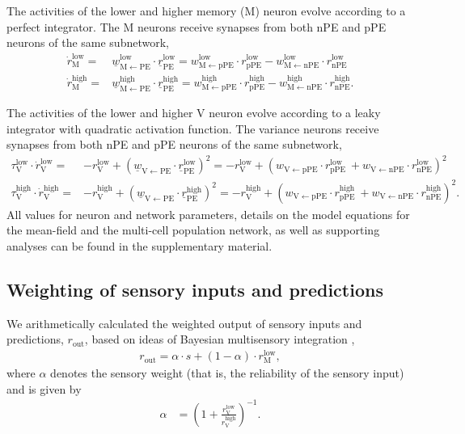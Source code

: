 \documentclass[10pt,a4paper]{article}
\begin{document}
The activities of the lower and higher memory (M) neuron evolve according to a perfect integrator. The M neurons receive synapses from both nPE and pPE neurons of the same subnetwork,
%
\begin{align}
\dot{r}_\mathrm{M}^\mathrm{low} =& \underline{w}_\mathrm{M \leftarrow PE}^\mathrm{low} \cdot \underline{r}_\mathrm{PE}^\mathrm{low} = w_\mathrm{M \leftarrow pPE}^\mathrm{low} \cdot r_\mathrm{pPE}^\mathrm{low} - w_\mathrm{M \leftarrow nPE}^\mathrm{low} \cdot r_\mathrm{nPE}^\mathrm{low} \nonumber \\
%
\dot{r}_\mathrm{M}^\mathrm{high} =& \underline{w}_\mathrm{M \leftarrow PE} ^\mathrm{high} \cdot \underline{r}_\mathrm{PE}^\mathrm{high} = w_\mathrm{M \leftarrow pPE}^\mathrm{high}  \cdot r_\mathrm{pPE}^\mathrm{high} - w_\mathrm{M \leftarrow nPE}^\mathrm{high}  \cdot r_\mathrm{nPE}^\mathrm{high} .
\end{align}
%

The activities of the lower and higher V neuron evolve according to a leaky integrator with quadratic activation function. The variance neurons receive synapses from both nPE and pPE neurons of the same subnetwork,
%
\begin{align}
\tau_\mathrm{V}^\mathrm{low} \cdot \dot{r}_\mathrm{V}^\mathrm{low} =& - r_\mathrm{V}^\mathrm{low} + \left( \underline{w}_\mathrm{V \leftarrow PE} \cdot \underline{r}_\mathrm{PE}^\mathrm{low}\right)^2 = - r_\mathrm{V}^\mathrm{low} + \left( w_\mathrm{V \leftarrow pPE} \cdot r_\mathrm{pPE}^\mathrm{low}\ + w_\mathrm{V \leftarrow nPE} \cdot r_\mathrm{nPE}^\mathrm{low}\right)^2 \nonumber\\
%
\tau_\mathrm{V}^\mathrm{high} \cdot \dot{r}_\mathrm{V}^\mathrm{high} =& - r_\mathrm{V}^\mathrm{high} + \left( \underline{w}_\mathrm{V \leftarrow PE} \cdot \underline{r}_\mathrm{PE}^\mathrm{high}\right)^2 = - r_\mathrm{V}^\mathrm{high} + \left( w_\mathrm{V \leftarrow pPE} \cdot r_\mathrm{pPE}^\mathrm{high}\ + w_\mathrm{V \leftarrow nPE} \cdot r_\mathrm{nPE}^\mathrm{high}\right)^2.
\end{align} 
%
All values for neuron and network parameters, details on the model equations for the mean-field and the multi-cell population network, as well as supporting analyses can be found in the supplementary material.

\subsection*{Weighting of sensory inputs and predictions}
%
We arithmetically calculated the weighted output of sensory inputs and predictions, $r_\mathrm{out}$, based on ideas of Bayesian multisensory integration \citep[see, e.g.][]{pouget2013probabilistic},
%
\begin{align}
r_\mathrm{out} = \alpha \cdot s + (1-\alpha) \cdot r_\mathrm{M}^\mathrm{low},
\end{align}
%
where $\alpha$ denotes the sensory weight (that is, the reliability of the sensory input) and is given by 
%
\begin{align}
\alpha &= \left( 1 + \frac{r_\mathrm{V}^\mathrm{low}}{r_\mathrm{V}^\mathrm{high}} \right)^{-1}.
\end{align}
\end{document}

